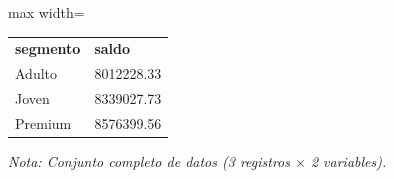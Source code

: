 

\begin{table}[htbp]

\centering

\begin{adjustbox}{max width=\textwidth}

\begin{tabular}{ll}

\rowcolor{ThemeBackground}
\rule{0pt}{0.45cm}
\textcolor{ThemeGold}{\bfseries segmento} & \textcolor{ThemeGold}{\bfseries saldo} \\

Adulto & 8012228.33 \\
Joven & 8339027.73 \\
Premium & 8576399.56 \\
\bottomrule
\end{tabular}

\end{adjustbox}

\vspace{0.15cm}
{\raggedright\sffamily\footnotesize\color{ThemeMuted}
\textit{Nota: Conjunto completo de datos (3 registros $\times$ 2 variables).}}

\end{table}

